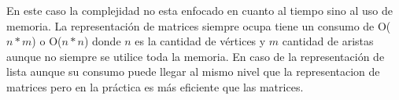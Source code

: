 En este caso la complejidad no esta enfocado en cuanto al tiempo sino al uso de memoria. La representación de matrices siempre ocupa tiene un consumo de O($n*m$) o O($n*n$) donde $n$ es la cantidad de vértices y  $m$ cantidad de aristas aunque no siempre se utilice toda la memoria. En caso de la representación de lista aunque su consumo puede llegar al mismo nivel que la representacion de matrices pero en la práctica es más eficiente que las matrices.